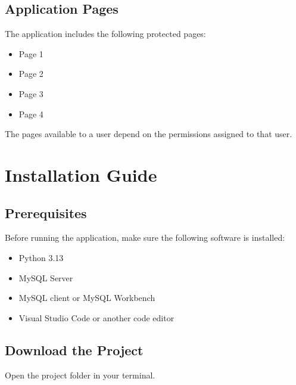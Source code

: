 \documentclass[letterpaper,10pt,english]{sphinxmanual}
\begin{document}
\subsection{Application Pages}
\label{\detokenize{overview:application-pages}}
\sphinxAtStartPar
The application includes the following protected pages:
\begin{itemize}
\item {} 
\sphinxAtStartPar
Page 1

\item {} 
\sphinxAtStartPar
Page 2

\item {} 
\sphinxAtStartPar
Page 3

\item {} 
\sphinxAtStartPar
Page 4

\end{itemize}

\sphinxAtStartPar
The pages available to a user depend on the permissions assigned to that user.

\sphinxstepscope


\section{Installation Guide}
\label{\detokenize{installation:installation-guide}}\label{\detokenize{installation::doc}}

\subsection{Prerequisites}
\label{\detokenize{installation:prerequisites}}
\sphinxAtStartPar
Before running the application, make sure the following software is installed:
\begin{itemize}
\item {} 
\sphinxAtStartPar
Python 3.13

\item {} 
\sphinxAtStartPar
MySQL Server

\item {} 
\sphinxAtStartPar
MySQL client or MySQL Workbench

\item {} 
\sphinxAtStartPar
Visual Studio Code or another code editor

\end{itemize}


\subsection{Download the Project}
\label{\detokenize{installation:download-the-project}}
\sphinxAtStartPar
Open the project folder in your terminal.
\end{document}
